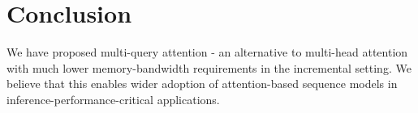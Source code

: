 \documentclass{article}
\begin{document}
\begin{table}[h!]
\caption{Billion-Word LM Benchmark Results.}
\label{tab:lm1b}
\begin{center}
\end{center}
\end{table}

\section{Conclusion}
We have proposed multi-query attention - an alternative to multi-head attention with much lower memory-bandwidth requirements in the incremental setting.  We believe that this enables wider adoption of attention-based sequence models in inference-performance-critical applications.




\end{document}
